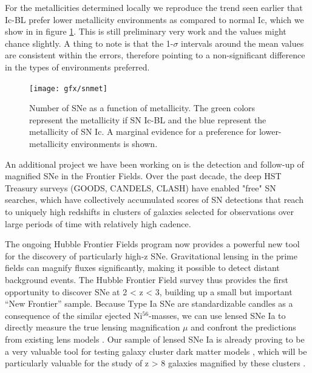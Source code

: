 For the metallicities determined locally we reproduce the trend seen earlier
that Ic-BL prefer lower metallicity environments as compared to normal Ic, which
we show in in figure \ref{fig:intro:snmet}. This is still preliminary very work
and the values might chance slightly. A thing to note is that the 1-$\sigma$
intervals around the mean values are consistent within the errors, therefore
pointing to a non-significant difference in the types of environments preferred.



\begin{figure}[htb]
	
	\texttt{[image: gfx/snmet]}
	
	\caption{Number of SNe as a function of metallicity. The green colors represent the metallicity if SN Ic-BL and the blue represent the metallicity of SN Ic. A marginal evidence for a preference for lower-metallicity environments is shown.}
	
	\label{fig:intro:snmet}
\end{figure}

An additional project we have been working on is the detection and follow-up of
magnified SNe in the Frontier Fields.
Over the past decade, the deep HST
Treasury surveys (GOODS, CANDELS, CLASH) have
enabled "free" SN searches, which
have collectively
accumulated scores of SN detections that reach to uniquely
high redshifts
\citep{Riess2007, Rodney2014b, Graur2014} in clusters of galaxies
selected for observations over large periods of time with relatively high
cadence.

The ongoing Hubble Frontier Fields program now provides a powerful new tool for
the discovery of
particularly high-z SNe. Gravitational lensing in the prime
fields can
magnify fluxes significantly, making it possible to detect distant
background
events. 
The Hubble Frontier Field survey thus provides the first
opportunity to discover
SNe at 2 < z < 3, building up a small but important “New
Frontier” sample.
Because Type Ia SNe are standardizable candles as a
consequence of the similar ejected Ni$^{56}$-masses, we can use lensed SNe Ia to
directly measure the true lensing magnification $\mu$ and confront the
predictions from existing lens models \citep[e.g.][]{Riehm2011, Li2012,
Patel2014}. Our sample of lensed SNe Ia is already proving
to be a very valuable
tool for testing galaxy cluster dark matter models \citep{Rodney2015}, which
will be particularly valuable for the study of z > 8 galaxies magnified by these
clusters \citep[e.g.][]{Zheng2012}.



